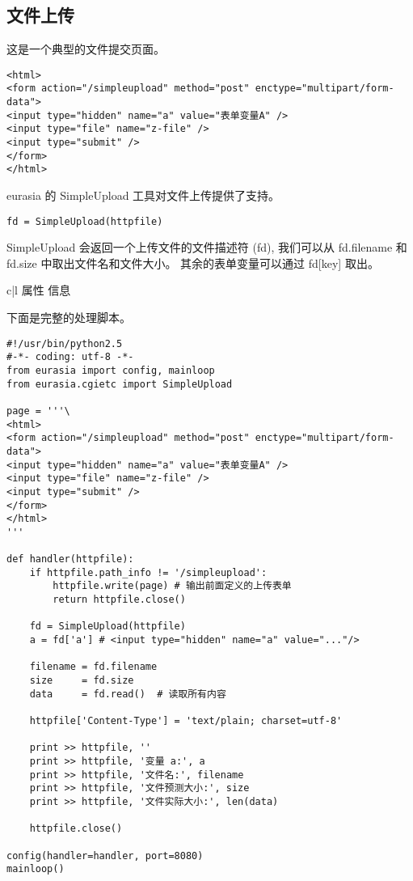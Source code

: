\documentclass{manual}
\begin{document}

\subsection{文件上传}

这是一个典型的文件提交页面。

\begin{verbatim}
<html>
<form action="/simpleupload" method="post" enctype="multipart/form-data">
<input type="hidden" name="a" value="表单变量A" />
<input type="file" name="z-file" />
<input type="submit" />
</form>
</html>
\end{verbatim}

eurasia 的 SimpleUpload 工具对文件上传提供了支持。

\begin{verbatim}
fd = SimpleUpload(httpfile)
\end{verbatim}

SimpleUpload 会返回一个上传文件的文件描述符 (fd), 我们可以从 fd.filename 和 fd.size 中取出文件名和文件大小。
其余的表单变量可以通过 fd[key] 取出。

\begin{tableii}{c|l}{}{ 属性 }{ 信息 }
\end{tableii}

下面是完整的处理脚本。

\begin{verbatim}
#!/usr/bin/python2.5
#-*- coding: utf-8 -*-
from eurasia import config, mainloop
from eurasia.cgietc import SimpleUpload

page = '''\
<html>
<form action="/simpleupload" method="post" enctype="multipart/form-data">
<input type="hidden" name="a" value="表单变量A" />
<input type="file" name="z-file" />
<input type="submit" />
</form>
</html>
'''

def handler(httpfile):
	if httpfile.path_info != '/simpleupload':
		httpfile.write(page) # 输出前面定义的上传表单
		return httpfile.close()

	fd = SimpleUpload(httpfile)
	a = fd['a'] # <input type="hidden" name="a" value="..."/>

	filename = fd.filename
	size     = fd.size
	data     = fd.read()  # 读取所有内容

	httpfile['Content-Type'] = 'text/plain; charset=utf-8'

	print >> httpfile, ''
	print >> httpfile, '变量 a:', a
	print >> httpfile, '文件名:', filename
	print >> httpfile, '文件预测大小:', size
	print >> httpfile, '文件实际大小:', len(data)

	httpfile.close()

config(handler=handler, port=8080)
mainloop()
\end{verbatim}
\end{document}
